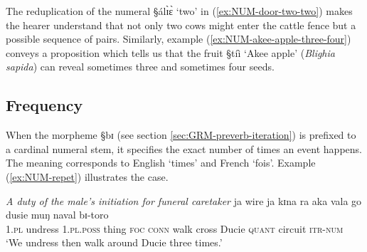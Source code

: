  



The reduplication of the numeral {\S álɪ̀ɛ̀} `two' in
(\ref{ex:NUM-door-two-two})
makes the
hearer understand that not only two cows might enter the cattle fence but a
possible sequence of  pairs. Similarly,   example 
(\ref{ex:NUM-akee-apple-three-four}) conveys a proposition which tells us that
the
fruit  {\S tíì}  `Akee apple' (\textit{Blighia sapida}) can reveal sometimes
three
and sometimes
four seeds.




\subsection{Frequency}
\label{sec:NUM-repet}

When the morpheme {\S bɪ}  (see section
\ref{sec:GRM-preverb-iteration}) is prefixed to a cardinal numeral  stem, it
specifies the exact number of times an event happens. The meaning corresponds
to English `times' and French `fois'.  Example (\ref{ex:NUM-repet})
illustrates the case.


 


\begin{exe}
\ex\label{ex:NUM-repet}{\it A duty of the male's initiation for  funeral
caretaker}
 \gll ja wire ja kɪna ra aka vala go dusie muŋ naval bɪ-toro\\
 \textsc{1.pl} undress  \textsc{1.pl.poss} thing    \textsc{foc}  
\textsc{conn} walk cross Ducie  \textsc{quant} circuit \textsc{itr-num} \\
\glt  `We undress then walk around Ducie three times.'
\end{exe}



